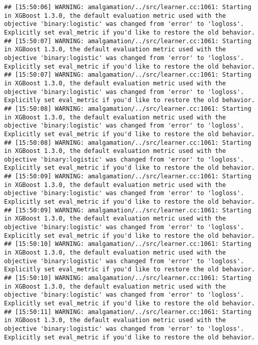 \documentclass[
]{book}
\begin{document}
\begin{verbatim}
## [15:50:06] WARNING: amalgamation/../src/learner.cc:1061: Starting in XGBoost 1.3.0, the default evaluation metric used with the objective 'binary:logistic' was changed from 'error' to 'logloss'. Explicitly set eval_metric if you'd like to restore the old behavior.
## [15:50:07] WARNING: amalgamation/../src/learner.cc:1061: Starting in XGBoost 1.3.0, the default evaluation metric used with the objective 'binary:logistic' was changed from 'error' to 'logloss'. Explicitly set eval_metric if you'd like to restore the old behavior.
## [15:50:07] WARNING: amalgamation/../src/learner.cc:1061: Starting in XGBoost 1.3.0, the default evaluation metric used with the objective 'binary:logistic' was changed from 'error' to 'logloss'. Explicitly set eval_metric if you'd like to restore the old behavior.
## [15:50:08] WARNING: amalgamation/../src/learner.cc:1061: Starting in XGBoost 1.3.0, the default evaluation metric used with the objective 'binary:logistic' was changed from 'error' to 'logloss'. Explicitly set eval_metric if you'd like to restore the old behavior.
## [15:50:08] WARNING: amalgamation/../src/learner.cc:1061: Starting in XGBoost 1.3.0, the default evaluation metric used with the objective 'binary:logistic' was changed from 'error' to 'logloss'. Explicitly set eval_metric if you'd like to restore the old behavior.
## [15:50:09] WARNING: amalgamation/../src/learner.cc:1061: Starting in XGBoost 1.3.0, the default evaluation metric used with the objective 'binary:logistic' was changed from 'error' to 'logloss'. Explicitly set eval_metric if you'd like to restore the old behavior.
## [15:50:09] WARNING: amalgamation/../src/learner.cc:1061: Starting in XGBoost 1.3.0, the default evaluation metric used with the objective 'binary:logistic' was changed from 'error' to 'logloss'. Explicitly set eval_metric if you'd like to restore the old behavior.
## [15:50:10] WARNING: amalgamation/../src/learner.cc:1061: Starting in XGBoost 1.3.0, the default evaluation metric used with the objective 'binary:logistic' was changed from 'error' to 'logloss'. Explicitly set eval_metric if you'd like to restore the old behavior.
## [15:50:10] WARNING: amalgamation/../src/learner.cc:1061: Starting in XGBoost 1.3.0, the default evaluation metric used with the objective 'binary:logistic' was changed from 'error' to 'logloss'. Explicitly set eval_metric if you'd like to restore the old behavior.
## [15:50:11] WARNING: amalgamation/../src/learner.cc:1061: Starting in XGBoost 1.3.0, the default evaluation metric used with the objective 'binary:logistic' was changed from 'error' to 'logloss'. Explicitly set eval_metric if you'd like to restore the old behavior.

\end{verbatim}
\end{document}
